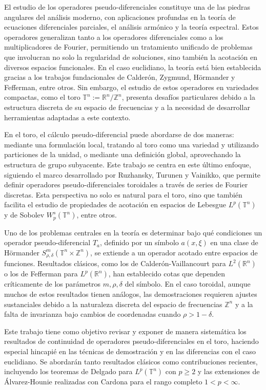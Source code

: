 El estudio de los operadores pseudo-diferenciales constituye una de las piedras angulares del análisis moderno, con aplicaciones profundas en la teoría de ecuaciones diferenciales parciales, el análisis armónico y la teoría espectral. Estos operadores generalizan tanto a los operadores diferenciales como a los multiplicadores de Fourier, permitiendo un tratamiento unificado de problemas que involucran no solo la regularidad de soluciones, sino también la acotación en diversos espacios funcionales. En el caso euclidiano, la teoría está bien establecida gracias a los trabajos fundacionales de Calderón, Zygmund, Hörmander y Fefferman, entre otros. Sin embargo, el estudio de estos operadores en variedades compactas, como el toro $\mathbb{T}^n := \mathbb{R}^n / \mathbb{Z}^n$, presenta desafíos particulares debido a la estructura discreta de su espacio de frecuencias y a la necesidad de desarrollar herramientas adaptadas a este contexto.

En el toro, el cálculo pseudo-diferencial puede abordarse de dos maneras: mediante una formulación local, tratando al toro como una variedad y utilizando particiones de la unidad, o mediante una definición global, aprovechando la estructura de grupo subyacente. Este trabajo se centra en este último enfoque, siguiendo el marco desarrollado por Ruzhansky, Turunen y Vainikko, que permite definir operadores pseudo-diferenciales toroidales a través de series de Fourier discretas. Esta perspectiva no solo es natural para el toro, sino que también facilita el estudio de propiedades de acotación en espacios de Lebesgue $L^p(\mathbb{T}^n)$ y de Sobolev $W^s_p(\mathbb{T}^n)$, entre otros.

Uno de los problemas centrales en la teoría es determinar bajo qué condiciones un operador pseudo-diferencial $T_a$, definido por un símbolo $a(x, \xi)$ en una clase de Hörmander $S^m_{\rho,\delta}(\mathbb{T}^n \times \mathbb{Z}^n)$, se extiende a un operador acotado entre espacios de funciones. Resultados clásicos, como los de Calderón-Vaillancourt para $L^2(\mathbb{R}^n)$ o los de Fefferman para $L^p(\mathbb{R}^n)$, han establecido cotas que dependen críticamente de los parámetros $m, \rho, \delta$ del símbolo. En el caso toroidal, aunque muchos de estos resultados tienen análogos, las demostraciones requieren ajustes sustanciales debido a la naturaleza discreta del espacio de frecuencias $\mathbb{Z}^n$ y a la falta de invarianza bajo cambios de coordenadas cuando $\rho > 1 - \delta$.

Este trabajo tiene como objetivo revisar y exponer de manera sistemática los resultados de continuidad de operadores pseudo-diferenciales en el toro, haciendo especial hincapié en las técnicas de demostración y en las diferencias con el caso euclidiano. Se abordarán tanto resultados clásicos como contribuciones recientes, incluyendo los teoremas de Delgado para $L^p(\mathbb{T}^n)$ con $p \geq 2$ y las extensiones de Álvarez-Hounie realizadas con Cardona para el rango completo $1 < p < \infty$. 

